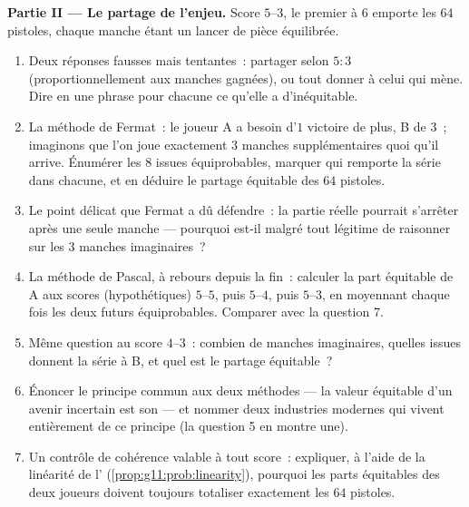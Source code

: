 \begin{problem}
\medskip
\noindent\textbf{Partie II --- Le partage de l'enjeu.}
Score $5$--$3$, le premier à $6$ emporte les $64$ pistoles, chaque
manche étant un lancer de pièce équilibrée.
\begin{enumerate}[resume]
  \item Deux réponses fausses mais tentantes~: partager selon
        $5 : 3$ (proportionnellement aux manches gagnées), ou tout
        donner à celui qui mène. Dire en une phrase pour chacune ce
        qu'elle a d'inéquitable.
  \item La méthode de Fermat~: le joueur A a besoin d'$1$ victoire
        de plus, B de $3$~; imaginons que l'on joue exactement $3$
        manches supplémentaires quoi qu'il arrive. Énumérer les $8$
        issues équiprobables, marquer qui remporte la série dans
        chacune, et en déduire le partage équitable des $64$
        pistoles.
  \item Le point délicat que Fermat a dû défendre~: la partie
        réelle pourrait s'arrêter après une seule manche --- pourquoi
        est-il malgré tout légitime de raisonner sur les $3$ manches
        imaginaires~?
  \item La méthode de Pascal, à rebours depuis la fin~: calculer la
        part équitable de A aux scores (hypothétiques) $5$--$5$,
        puis $5$--$4$, puis $5$--$3$, en moyennant chaque fois les
        deux futurs équiprobables. Comparer avec la question 7.
  \item Même question au score $4$--$3$~: combien de manches
        imaginaires, quelles issues donnent la série à B, et quel
        est le partage équitable~?
  \item Énoncer le principe commun aux deux méthodes --- la valeur
        équitable d'un avenir incertain est son \emph{} ---
        et nommer deux industries modernes qui vivent entièrement de
        ce principe (la question 5 en montre une).
  \item Un contrôle de cohérence valable à tout score~: expliquer,
        à l'aide de la linéarité de l'
        (\cref{prop:g11:prob:linearity}), pourquoi les parts
        équitables des deux joueurs doivent toujours totaliser
        exactement les $64$ pistoles.
\end{enumerate}


\end{problem}
